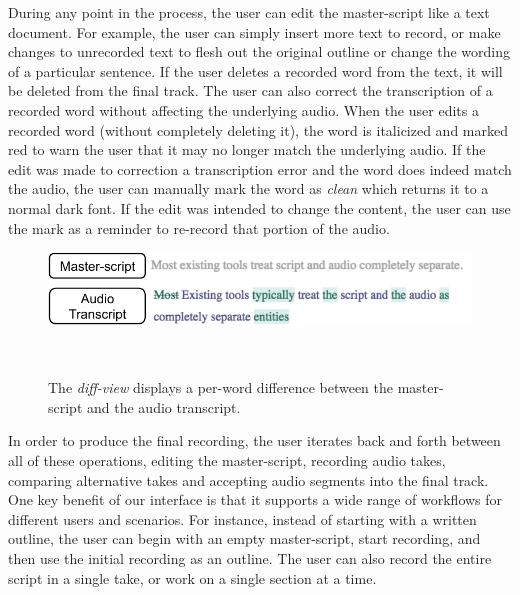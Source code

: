 During any point in the process, the user can edit the master-script like a text document.  For example, the user can simply insert more text to record, or make changes to unrecorded text to flesh out the original outline or change the wording of a particular sentence. If the user deletes a recorded word from the text, it will be deleted from the final track. The user can also correct the transcription of a recorded word without affecting the underlying audio. When the user edits a recorded word (without completely deleting it), the word is italicized and marked red to warn the user that it may no longer match the underlying audio. If the edit was made to correction a transcription error and the word does indeed match the audio, the user can manually mark the word as \textit{clean} which returns it to a normal dark font. If the edit was intended to change the content, the user can use the mark as a reminder to re-record that portion of the audio.
\begin{figure}
\centering
  \includegraphics[width=1.0\columnwidth]{figures/diffview}
  \caption{The \textit{diff-view} displays a per-word difference between the master-script and the audio transcript. }~\label{fig:diffview}
\end{figure}


In order to produce the final recording, the user iterates back and forth between all of these operations, editing the master-script, recording audio takes, comparing alternative takes and accepting audio segments into the final track.
One key benefit of our interface is that it supports a wide range of workflows for different users and scenarios. For instance, instead of starting with a written outline, the user can begin with an empty master-script, start recording, and then use  the initial recording as an outline. The user can also record the entire script in a single take, or work on a single section at a time. 
